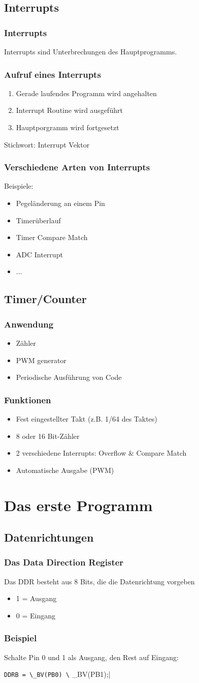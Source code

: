 \documentclass{beamer}
\begin{document}
\subsection{Interrupts}
\frame
{
	\frametitle{Interrupts}
	\begin{centering}
		\large{Interrupts sind Unterbrechungen des Hauptprogramms.}
	\end{centering}
}
\frame
{
	\frametitle{Aufruf eines Interrupts}
	\begin{enumerate}
		\item Gerade laufendes Programm wird angehalten
		\item Interrupt Routine wird ausgef\"uhrt
		\item Hauptporgramm wird fortgesetzt
	\end{enumerate}
	\large{Stichwort: Interrupt Vektor}
}
\frame
{
	\frametitle{Verschiedene Arten von Interrupts}
	Beispiele:
	\begin{itemize}
		\item Pegel\"anderung an einem Pin
		\item Timer\"uberlauf
		\item Timer Compare Match
		\item ADC Interrupt
		\item ...
	\end{itemize}
}
\subsection{Timer/Counter}
\frame
{
	\frametitle{Anwendung}
	\begin{itemize}
		\item Z\"ahler
		\item PWM generator
		\item Periodische Ausf\"uhrung von Code
	\end{itemize}
}
\frame
{
	\frametitle{Funktionen}
	\begin{itemize}
		\item Fest eingestellter Takt (z.B. 1/64 des Taktes)
		\item 8 oder 16 Bit-Z\"ahler
		\item 2 verschiedene Interrupts: Overflow \& Compare Match
		\item Automatische Ausgabe (PWM)
	\end{itemize}
}
\section{Das erste Programm}
\subsection{Datenrichtungen}
\frame
{
	\frametitle{Das Data Direction Register}
	Das DDR besteht aus 8 Bits, die die Datenrichtung vorgeben
	\begin{itemize}
		\item 1 = Ausgang
		\item 0 = Eingang
	\end{itemize}
}
\frame
{
	\frametitle{Beispiel}
	Schalte Pin 0 und 1 als Ausgang, den Rest auf Eingang:
	\par
	\lstinline|DDRB = \_BV(PB0) \| \_BV(PB1);|
}
\end{document}
